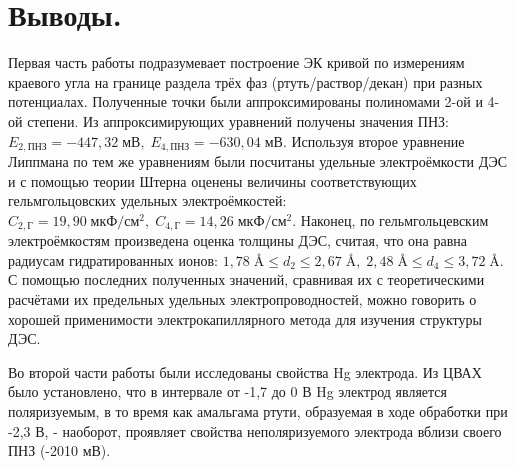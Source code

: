 \documentclass[a4paper, 11pt]{article}%
\begin{document}
\section{Выводы.} \;
\par Первая часть работы подразумевает построение ЭК кривой по измерениям краевого угла на границе раздела трёх фаз (ртуть/раствор/декан) при разных потенциалах. Полученные точки были аппроксимированы полиномами 2-ой и 4-ой степени. Из аппроксимирующих уравнений получены значения ПНЗ: $E_{2, \text{ПНЗ}} = -447,32 \; \text{мВ}, \; E_{4, \text{ПНЗ}} = -630,04 \; \text{мВ}$. Используя второе уравнение Липпмана по тем же уравнениям были посчитаны удельные электроёмкости ДЭС и с помощью теории Штерна оценены величины соответствующих гельмгольцовских удельных электроёмкостей: $C_{2, \text{Г}} = 19,90 \; \text{мкФ}/\text{см}^2, \; C_{4, \text{Г}} = 14,26 \; \text{мкФ}/\text{см}^2$. Наконец, по гельмгольцевским электроёмкостям произведена оценка толщины ДЭС, считая, что она равна радиусам гидратированных ионов: $1,78 \; \si{\angstrom} \leq d_2 \leq 2,67 \; \si{\angstrom}, \; 2,48 \; \si{\angstrom} \leq d_4 \leq 3,72 \; \si{\angstrom}$. С помощью последних полученных значений, сравнивая их с теоретическими расчётами их предельных удельных электропроводностей, можно говорить о хорошей применимости электрокапиллярного метода для изучения структуры ДЭС.
\par Во второй части работы были исследованы свойства Hg электрода. Из ЦВАХ было установлено, что в интервале от -1,7 до 0 В Hg электрод является поляризуемым, в то время как амальгама ртути, образуемая в ходе обработки при -2,3 В, - наоборот, проявляет свойства неполяризуемого электрода вблизи своего ПНЗ (-2010 мВ).
\newpage
\end{document}
